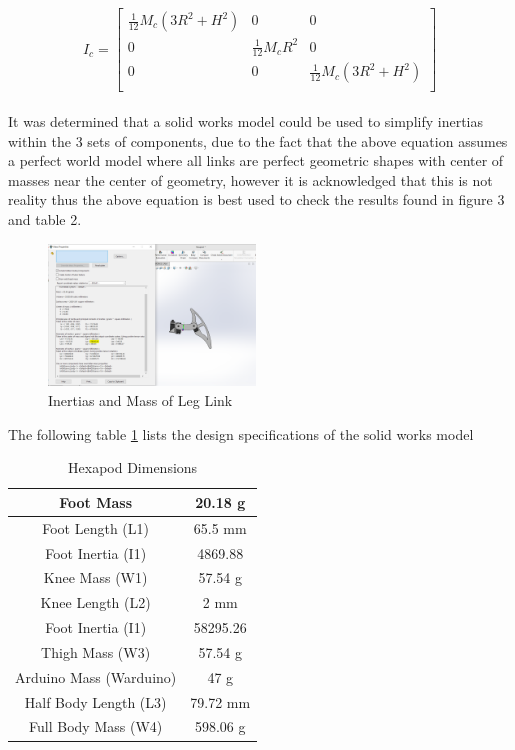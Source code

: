 \begin{equation*}
I_c = 
\begin{bmatrix}
\frac{1}{12} M_c (3R^2+H^2) & 0 & 0\\
0 & \frac{1}{12} M_c R^2 & 0\\
0 & 0 & \frac{1}{12} M_c (3R^2+H^2)\\

\end{bmatrix}
\end{equation*}\\

It was determined that a solid works model could be used to simplify inertias within the 3 sets of components, due to the fact that the above equation assumes a perfect world model where all links are perfect geometric shapes with center of masses near the center of geometry, however it is acknowledged that this is not reality thus the above equation is best used to check the results found in figure 3 and table 2.

\begin{figure}[h]
 \centering
   \includegraphics[width = 0.49\textwidth]{figures/10.png}                \caption{Inertias and Mass of Leg Link}
   \label{fig:Inertias and Mass of Leg Link}
\end{figure}

The following table \ref{tab2} lists the design specifications of the solid works model

\begin{table}[htbp]
	\caption{Hexapod Dimensions}
	\begin{center}
		\begin{tabular}{|c|c|}
			\hline  
			Foot Mass & 20.18 g \\
			\hline
			Foot Length (L1) & 65.5 mm\\
			\hline
			Foot Inertia (I1) & 4869.88\\
			\hline
			Knee Mass (W1) & 57.54 g\\
			\hline
			Knee Length (L2) & 2 mm\\
			\hline
			Foot Inertia (I1) & 58295.26\\
			\hline
			Thigh Mass (W3) & 57.54 g\\
			\hline
			Arduino Mass (Warduino) & 47 g\\
			\hline
			Half Body Length (L3) & 79.72 mm\\
			\hline
			Full Body Mass (W4) & 598.06 g \\
		 	\hline
			
		\end{tabular}
		\end{center}
	\label{tab2}
	
\end{table}


